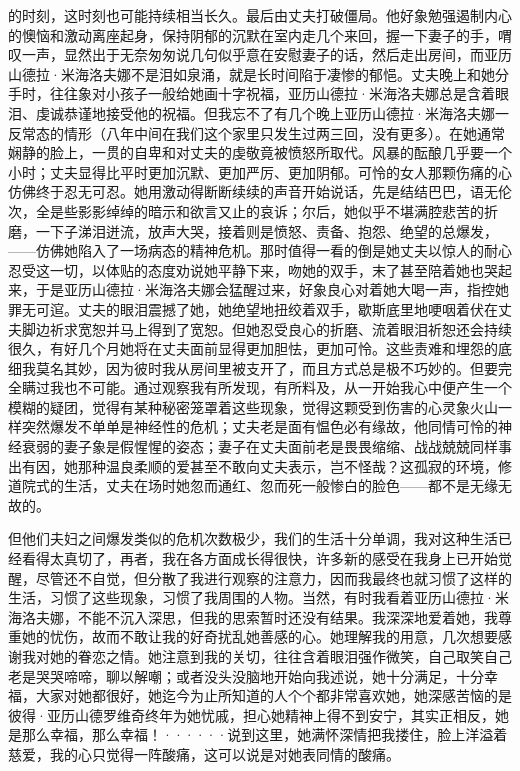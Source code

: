 \documentclass[12pt, UTF8]{ctexbook}
\begin{document}
的时刻，这时刻也可能持续相当长久。最后由丈夫打破僵局。他好象勉强遏制内心的懊恼和激动离座起身，保持阴郁的沉默在室内走几个来回，握一下妻子的手，喟叹一声，显然出于无奈匆匆说几句似乎意在安慰妻子的话，然后走出房间，而亚历山德拉·米海洛夫娜不是泪如泉涌，就是长时间陷于凄惨的郁悒。丈夫晚上和她分手时，往往象对小孩子一般给她画十字祝福，亚历山德拉·米海洛夫娜总是含着眼泪、虔诚恭谨地接受他的祝福。但我忘不了有几个晚上亚历山德拉·米海洛夫娜一反常态的情形（八年中间在我们这个家里只发生过两三回，没有更多）。在她通常娴静的脸上，一贯的自卑和对丈夫的虔敬竟被愤怒所取代。风暴的酝酿几乎要一个小时；丈夫显得比平时更加沉默、更加严厉、更加阴郁。可怜的女人那颗伤痛的心仿佛终于忍无可忍。她用激动得断断续续的声音开始说话，先是结结巴巴，语无伦次，全是些影影绰绰的暗示和欲言又止的哀诉；尔后，她似乎不堪满腔悲苦的折磨，一下子涕泪迸流，放声大哭，接着则是愤怒、责备、抱怨、绝望的总爆发，——仿佛她陷入了一场病态的精神危机。那时值得一看的倒是她丈夫以惊人的耐心忍受这一切，以体贴的态度劝说她平静下来，吻她的双手，末了甚至陪着她也哭起来，于是亚历山德拉·米海洛夫娜会猛醒过来，好象良心对着她大喝一声，指控她罪无可逭。丈夫的眼泪震撼了她，她绝望地扭绞着双手，歇斯底里地哽咽着伏在丈夫脚边祈求宽恕并马上得到了宽恕。但她忍受良心的折磨、流着眼泪祈恕还会持续很久，有好几个月她将在丈夫面前显得更加胆怯，更加可怜。这些责难和埋怨的底细我莫名其妙，因为彼时我从房间里被支开了，而且方式总是极不巧妙的。但要完全瞒过我也不可能。通过观察我有所发现，有所料及，从一开始我心中便产生一个模糊的疑团，觉得有某种秘密笼罩着这些现象，觉得这颗受到伤害的心灵象火山一样突然爆发不单单是神经性的危机；丈夫老是面有愠色必有缘故，他同情可怜的神经衰弱的妻子象是假惺惺的姿态；妻子在丈夫面前老是畏畏缩缩、战战兢兢同样事出有因，她那种温良柔顺的爱甚至不敢向丈夫表示，岂不怪哉？这孤寂的环境，修道院式的生活，丈夫在场时她忽而通红、忽而死一般惨白的脸色——都不是无缘无故的。
\par 但他们夫妇之间爆发类似的危机次数极少，我们的生活十分单调，我对这种生活已经看得太真切了，再者，我在各方面成长得很快，许多新的感受在我身上已开始觉醒，尽管还不自觉，但分散了我进行观察的注意力，因而我最终也就习惯了这样的生活，习惯了这些现象，习惯了我周围的人物。当然，有时我看着亚历山德拉·米海洛夫娜，不能不沉入深思，但我的思索暂时还没有结果。我深深地爱着她，我尊重她的忧伤，故而不敢让我的好奇扰乱她善感的心。她理解我的用意，几次想要感谢我对她的眷恋之情。她注意到我的关切，往往含着眼泪强作微笑，自己取笑自己老是哭哭啼啼，聊以解嘲；或者没头没脑地开始向我述说，她十分满足，十分幸福，大家对她都很好，她迄今为止所知道的人个个都非常喜欢她，她深感苦恼的是彼得·亚历山德罗维奇终年为她忧戚，担心她精神上得不到安宁，其实正相反，她是那么幸福，那么幸福！······说到这里，她满怀深情把我搂住，脸上洋溢着慈爱，我的心只觉得一阵酸痛，这可以说是对她表同情的酸痛。
\end{document}
